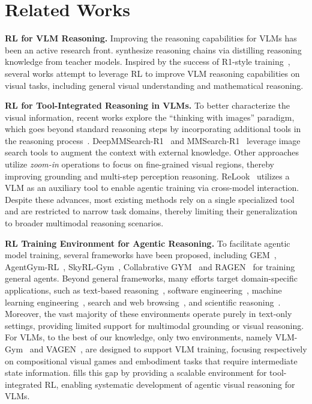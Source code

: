 \section{Related Works}
\label{sec:related}

\noindent\textbf{RL for VLM Reasoning.} 
Improving the reasoning capabilities for VLMs has been an active research front. 
\cite{xu2025llava} synthesize reasoning chains via distilling reasoning knowledge from teacher models. 
Inspired by the success of R1-style training~\citep{guo2025deepseek}, several works attempt to leverage RL \citep{huang2025vision,liu2025visualrft,shen2025vlm,liu2025visionreasoner,li2025self} to improve VLM reasoning capabilities on visual tasks, including general visual understanding and mathematical reasoning.

\noindent\textbf{RL for Tool-Integrated Reasoning in VLMs.}
To better characterize the visual information, recent works explore the ``thinking with images'' paradigm, which goes beyond standard reasoning steps by incorporating additional tools in the reasoning process~\cite{li2025tirbench,han2025tiger}. 
DeepMMSearch-R1~\citep{narayan2025deepmmsearchr1} and MMSearch-R1~\citep{wu2025mmsearchr1} leverage image search tools to augment the context with external knowledge. 
Other approaches~\citep{zheng2025deepeyes,fan2025grit,su2025openthinkimg,zhang2025chain} utilize \emph{zoom-in} operations to focus on fine-grained visual regions, thereby improving grounding and multi-step perception reasoning. 
ReLook~\citep{li2025relook} utilizes a VLM as an auxiliary tool to enable agentic training via cross-model interaction.
Despite these advances, most existing methods rely on a single specialized tool and are restricted to narrow task domains, thereby limiting their generalization to broader multimodal reasoning scenarios.

\noindent\textbf{RL Training Environment for Agentic Reasoning.}
To facilitate agentic model training, several frameworks have been proposed, including
GEM~\citep{liu2025gem}, 
AgentGym‑RL~\citep{xi2025agentgym}, 
SkyRL‑Gym~\citep{cao2025skyrl}, Collabrative GYM~\citep{shao2024collaborative} and RAGEN~\citep{wang2025ragen}
 for training general agents.
Beyond general frameworks, many efforts target domain-specific applications, such as text-based reasoning~\citep{stojanovski2025reasoninggym}, software engineering~\citep{swegym,yang2025swesmith,codegym,jain2025regym}, machine learning engineering~\citep{nathani2025mlgym,qiang2025mlesmith,qiang2025mledojo}, search and web browsing~\citep{xiong2025rag,xu2025acesearcher,chezelles2024browsergym}, and scientific reasoning~\citep{xu2025medagentgym,wang2022scienceworld}.
Moreover, the vast majority of these environments operate purely in text-only settings, providing limited support for multimodal grounding or visual reasoning. 
For VLMs, to the best of our knowledge, only two environments, namely VLM-Gym~\citep{chen2025g1} and VAGEN~\citep{wang2025vagen}, are designed to support VLM training, focusing respectively on compositional visual games and embodiment tasks that require intermediate state information. 
\env fills this gap by providing a scalable environment for tool-integrated RL, enabling systematic development of agentic visual reasoning for VLMs.